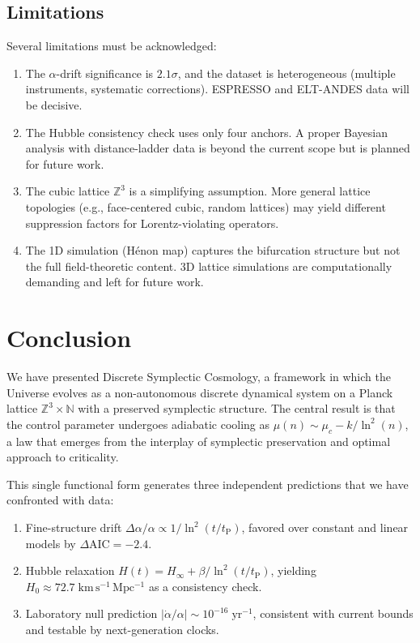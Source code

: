 \documentclass[twocolumn,showpacs,preprintnumbers,amsmath,amssymb,prd]{revtex4-2}
\newcommand{\lnq}{\ln^2}
\newcommand{\tP}{t_{\mathrm{P}}}
\newcommand{\Hinf}{H_{\infty}}
\newcommand{\ZZ}{\mathbb{Z}}
\newcommand{\NN}{\mathbb{N}}
\begin{document}
\subsection{Limitations}
\label{sec:limits}

Several limitations must be acknowledged:

\begin{enumerate}
  \item The $\alpha$-drift significance is $2.1\sigma$, and the
    dataset is heterogeneous (multiple instruments, systematic
    corrections).  ESPRESSO and ELT-ANDES data will be decisive.
  \item The Hubble consistency check uses only four anchors.
    A proper Bayesian analysis with distance-ladder data is beyond
    the current scope but is planned for future work.
  \item The cubic lattice $\ZZ^3$ is a simplifying assumption.
    More general lattice topologies (e.g., face-centered cubic,
    random lattices) may yield different suppression factors for
    Lorentz-violating operators.
  \item The 1D simulation (H\'enon map) captures the bifurcation
    structure but not the full field-theoretic content.
    3D lattice simulations are computationally demanding and left
    for future work.
\end{enumerate}

\section{Conclusion}\label{sec:conclusion}

We have presented Discrete Symplectic Cosmology, a framework in
which the Universe evolves as a non-autonomous discrete dynamical
system on a Planck lattice $\ZZ^3 \times \NN$ with a preserved
symplectic structure.
The central result is that the control parameter undergoes
adiabatic cooling as $\mu(n) \sim \mu_c - k/\lnq(n)$, a law
that emerges from the interplay of symplectic preservation and
optimal approach to criticality.

This single functional form generates three independent
predictions that we have confronted with data:
\begin{enumerate}
  \item Fine-structure drift $\Delta\alpha/\alpha \propto
    1/\lnq(t/\tP)$, favored over constant and linear models
    by $\Delta\mathrm{AIC} = -2.4$.
  \item Hubble relaxation $H(t) = \Hinf + \beta/\lnq(t/\tP)$,
    yielding $H_0 \approx 72.7\;\mathrm{km\,s^{-1}\,Mpc^{-1}}$
    as a consistency check.
  \item Laboratory null prediction
    $|\dot\alpha/\alpha| \sim 10^{-16}\;\mathrm{yr}^{-1}$,
    consistent with current bounds and testable by
    next-generation clocks.
\end{enumerate}
\end{document}
